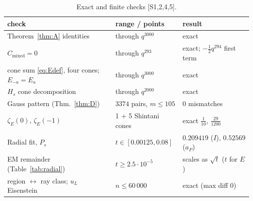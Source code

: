 \documentclass[11pt]{article}
\theoremstyle{definition}
\newcommand{\Cmixed}{C_{\mathrm{mixed}}}
\newcommand{\src}[1]{\textup{[S#1]}}
\begin{document}
\begin{table}[ht]\centering\small
\begin{tabular}{p{6.2cm}p{4.2cm}p{4.2cm}}\toprule
check & range / points & result\\\midrule
Theorem~\ref{thm:A} identities & through $q^{3000}$ & exact\\
$\Cmixed=0$ & through $q^{293}$ & exact; $-\tfrac12q^{294}$ first term\\
cone sum \eqref{eq:Edef}, four cones; $E_{-a}=E_a$ & through $q^{3000}$ & exact\\
$H_s$ cone decomposition & through $q^{2000}$ & exact\\
Gauss pattern (Thm.~\ref{thm:D}) & $3374$ pairs, $m\le105$ & 0 mismatches\\
$\zeta_E(0)$, $\zeta_E(-1)$ & 1 + 5 Shintani cones & exact $\tfrac1{10}$, $\tfrac{29}{1200}$\\
Radial fit, $P_s$ & $t\in[0.00125,0.08]$ & $0.209419$ ($I$), $0.52569$ ($a_P$)\\
EM remainder (Table~\ref{tab:radial}) & $t\ge2.5\cdot10^{-5}$ & scales as $\sqrt t$ ($t$ for $E$)\\
region $\leftrightarrow$ ray class; $u_L$ Eisenstein & $n\le60\,000$ & exact (max diff $0$)\\
\bottomrule
\end{tabular}
\caption{Exact and finite checks \src{1,2,4,5}.}
\end{table}
\end{document}
